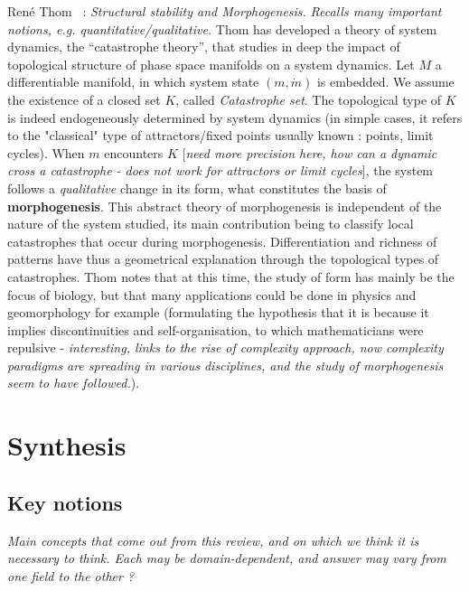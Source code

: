 \documentclass{article}
\begin{document}
Ren{\'e} Thom~\cite{thom1974stabilite} : \textit{Structural stability and Morphogenesis.} \textit{Recalls many important notions, e.g. quantitative/qualitative.} Thom has developed a theory of system dynamics, the ``catastrophe theory'', that studies in deep the impact of topological structure of phase space manifolds on a system dynamics. Let $M$ a differentiable manifold, in which system state $(m,\dot{m})$ is embedded. We assume the existence of a closed set $K$, called \emph{Catastrophe set}. The topological type of $K$ is indeed endogeneously determined by system dynamics (in simple cases, it refers to the "classical" type of attractors/fixed points usually known : points, limit cycles). When $m$ encounters $K$ [\textit{need more precision here, how can a dynamic cross a catastrophe - does not work for attractors or limit cycles}], the system follows a \emph{qualitative} change in its form, what constitutes the basis of \textbf{morphogenesis}. This abstract theory of morphogenesis is independent of the nature of the system studied, its main contribution being to classify local catastrophes that occur during morphogenesis. Differentiation and richness of patterns have thus a geometrical explanation through the topological types of catastrophes. Thom notes that at this time, the study of form has mainly be the focus of biology, but that many applications could be done in physics and geomorphology for example (formulating the hypothesis that it is because it implies discontinuities and self-organisation, to which mathematicians were repulsive - \textit{interesting, links to the rise of complexity approach, now complexity paradigms are spreading in various disciplines, and the study of morphogenesis seem to have followed.}).






\section{Synthesis}

\subsection{Key notions}

\textit{Main concepts that come out from this review, and on which we think it is necessary to think. Each may be domain-dependent, and answer may vary from one field to the other ?}
\end{document}
